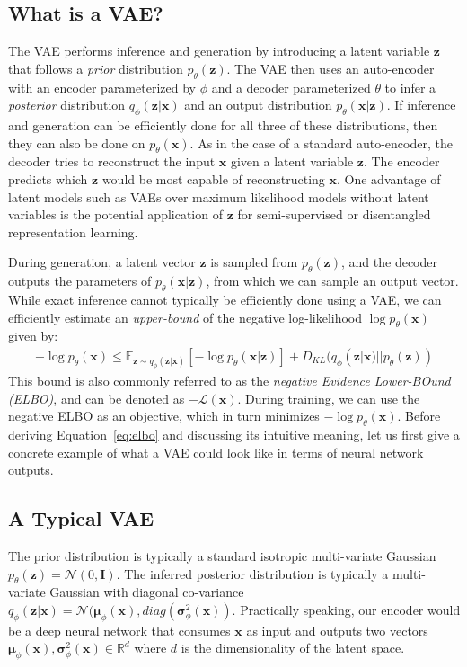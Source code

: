 \documentclass{article}
\begin{document}
\subsection{What is a VAE?}

The VAE performs inference and generation by introducing a latent variable $\mathbf{z}$ that follows a \emph{prior} distribution $p_\theta(\mathbf{z})$. The VAE then uses an auto-encoder with an encoder parameterized by $\phi$ and a decoder parameterized $\theta$ to infer a \emph{posterior} distribution $q_\phi(\mathbf{z}|\mathbf{x})$ and an output distribution  $p_\theta(\mathbf{x}|\mathbf{z})$. If inference and generation can be efficiently done for all three of these distributions, then they can also be done on $p_\theta(\mathbf{x})$.
As in the case of a standard auto-encoder, the decoder tries to reconstruct the input $\mathbf{x}$ given a latent variable $\mathbf{z}$. The encoder predicts which $\mathbf{z}$ would be most capable of reconstructing $\mathbf{x}$.
One advantage of latent models such as VAEs over maximum likelihood models without latent variables is the potential application of $\mathbf{z}$ for semi-supervised or disentangled representation learning.

During generation, a latent vector $\mathbf{z}$ is sampled from $p_\theta(\mathbf{z})$, and the decoder outputs the parameters of $p_\theta(\mathbf{x}| \mathbf{z})$, from which we can sample an output vector.
While exact inference cannot typically be efficiently done using a VAE, we can efficiently estimate an \emph{upper-bound} of the negative log-likelihood $\log p_\theta(\mathbf{x})$ given by:
\begin{align}
    -\log p_\theta(\mathbf{x}) \leq  \mathbb{E}_{\mathbf{z} \sim  q_\phi(\mathbf{z}|\mathbf{x})}[- \log p_\theta(\mathbf{x}| \mathbf{z})] + D_{KL}(q_\phi(\mathbf{z}|\mathbf{x}) || p_\theta(\mathbf{z})) \label{eq:elbo}
\end{align}
This bound is also commonly referred to as the \emph{negative Evidence Lower-BOund (ELBO)}, and can be denoted as $-\mathcal{L}(\mathbf{x})$.
During training, we can use the negative ELBO as an objective, which in turn minimizes $-\log p_\theta(\mathbf{x})$. 
Before deriving Equation~\ref{eq:elbo} and discussing its intuitive meaning, let us first give a concrete example of what a VAE could look like in terms of neural network outputs.

\subsection{A Typical VAE}
\label{sec:example}
The prior distribution is typically a standard isotropic multi-variate Gaussian $p_\theta(\mathbf{z})=\mathcal{N}(0,\mathbf{I})$.
The inferred posterior distribution is typically a multi-variate Gaussian with diagonal co-variance $q_\phi(\mathbf{z}|\mathbf{x}) = \mathcal{N}(\boldsymbol \mu_\phi(\mathbf{x}), diag(\boldsymbol \sigma^2_\phi (\mathbf{x}))$.
Practically speaking, our encoder would be a deep neural network that consumes $\mathbf{x}$ as input and outputs two vectors $\boldsymbol \mu_\phi(\mathbf{x}), \boldsymbol \sigma^2_\phi (\mathbf{x})\in \mathbb{R}^d$ where $d$ is the dimensionality of the latent space.
\end{document}
